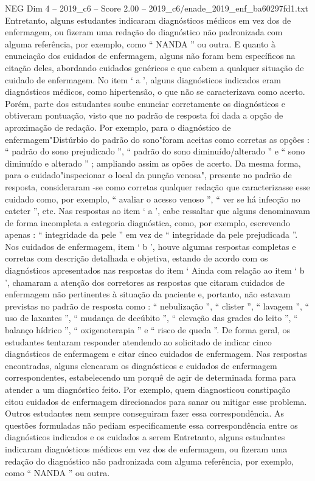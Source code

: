 \begin{textsample}{NEG Dim 4 – 2019\_c6 – Score 2.00 – 2019\_c6/enade\_2019\_enf\_ba60297fd1.txt}
Entretanto, alguns estudantes indicaram diagnósticos médicos em vez dos de enfermagem, ou fizeram uma redação do diagnóstico não padronizada com alguma referência, por exemplo, como “ NANDA ” ou outra.
E quanto à enunciação dos cuidados de enfermagem, alguns não foram bem específicos na citação deles, abordando cuidados genéricos e que cabem a qualquer situação de cuidado de enfermagem.
No item ‘ a ’, alguns diagnósticos indicados eram diagnósticos médicos, como hipertensão, o que não se caracterizava como acerto.
Porém, parte dos estudantes soube enunciar corretamente os diagnósticos e obtiveram pontuação, visto que no padrão de resposta foi dada a opção de aproximação de redação.
Por exemplo, para o diagnóstico de enfermagem"Distúrbio do padrão do sono"foram aceitas como corretas as opções : “ padrão do sono prejudicado ”, “ padrão do sono diminuído/alterado ” e “ sono diminuído e alterado ” ; ampliando assim as opões de acerto.
Da mesma forma, para o cuidado"inspecionar o local da punção venosa", presente no padrão de resposta, consideraram -se como corretas qualquer redação que caracterizasse esse cuidado como, por exemplo, “ avaliar o acesso venoso ”, “ ver se há infecção no cateter ”, etc.
Nas respostas ao item ‘ a ’, cabe ressaltar que alguns denominavam de forma incompleta a categoria diagnóstica, como, por exemplo, escrevendo apenas : “ integridade da pele ” em vez de “ integridade da pele prejudicada ”.
Nos cuidados de enfermagem, item ‘ b ’, houve algumas respostas completas e corretas com descrição detalhada e objetiva, estando de acordo com os diagnósticos apresentados nas respostas do item ‘ Ainda com relação ao item ‘ b ’, chamaram a atenção dos corretores as respostas que citaram cuidados de enfermagem não pertinentes à situação da paciente e, portanto, não estavam previstas no padrão de resposta como : “ nebulização ”, “ clister ”, “ lavagem ”, “ uso de laxantes ”, “ mudança de decúbito ”, “ elevação das grades do leito ”, “ balanço hídrico ”, “ oxigenoterapia ” e “ risco de queda ”.
De forma geral, os estudantes tentaram responder atendendo ao solicitado de indicar cinco diagnósticos de enfermagem e citar cinco cuidados de enfermagem.
Nas respostas encontradas, alguns elencaram os diagnósticos e cuidados de enfermagem correspondentes, estabelecendo um porquê de agir de determinada forma para atender a um diagnóstico feito.
Por exemplo, quem diagnosticou constipação citou cuidados de enfermagem direcionados para sanar ou mitigar esse problema.
Outros estudantes nem sempre conseguiram fazer essa correspondência.
As questões formuladas não pediam especificamente essa correspondência entre os diagnósticos indicados e os cuidados a serem Entretanto, alguns estudantes indicaram diagnósticos médicos em vez dos de enfermagem, ou fizeram uma redação do diagnóstico não padronizada com alguma referência, por exemplo, como “ NANDA ” ou outra.

\end{textsample}
